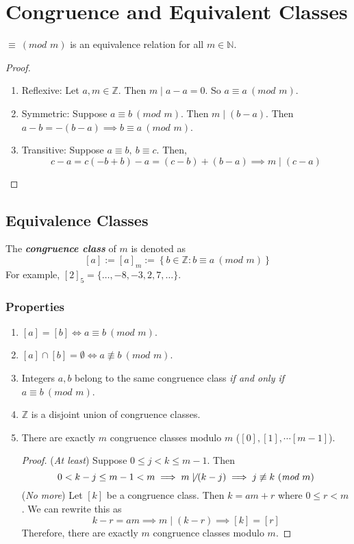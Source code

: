 \documentclass{report}
\newcommand{\Z}{\mathbb{Z}}
\newcommand{\N}{\mathbb{N}}
\newcommand{\textib}[1]{\textit{\textbf{{#1}}}}
\newcommand{\proposition}[1]{\begin{tcolorbox}[title=\textit{Proposition}]{#1}\end{tcolorbox}}
\renewcommand{\mod}[1]{\ (\textit{mod } {#1})}
\begin{document}
\section{Congruence and Equivalent Classes}
\proposition {
    $\equiv \mod{m}$ is an equivalence relation for all $m \in \N$.
}
\begin{proof}
    \begin{enumerate}[label=\textit{(\roman*)}]
        \item Reflexive: Let $a, m \in \Z$. Then $m \mid a - a = 0$. So $a \equiv a \mod{m}$.
        \item Symmetric: Suppose $a \equiv b \mod{m}$. Then $m \mid (b - a)$. Then $a - b = - (b - a)
            \implies b \equiv a \mod{m}$.
        \item Transitive: Suppose $a \equiv b, \ b \equiv c$. Then, 
            \[c - a = c (- b + b) - a = (c - b) + (b - a) \implies m \mid (c - a)\]
    \end{enumerate}
\end{proof}

\subsection{Equivalence Classes}
The \textib{congruence class} of $m$ is denoted as
\[[a] := [a]_m := \left\{ b \in \Z : b \equiv a \mod{m} \right\}\]
For example, $[2]_5 = \{ \ldots, -8, -3, 2, 7, \ldots \}$.


\subsubsection{Properties}
\begin{enumerate}[label=\textit{(\roman*)}]
    \item $[a] = [b] \iff a \equiv b \mod{m}$.
    \item $[a] \cap [b] = \emptyset \iff a \not \equiv b \mod{m}$.
    \item Integers $a, b$ belong to the same congruence class \textit{if and only if} $a \equiv b \mod{m}$.
    \item $\Z$ is a disjoint union of congruence classes.
    \item There are exactly $m$ congruence classes modulo $m$ ($[0], [1], \cdots [m - 1]$).
        \begin{proof}
            (\textit{At least})
            \newline
            Suppose $0 \leq j < k \leq m - 1$. Then 
            \[0 < k - j \leq m - 1 < m \implies m \not \mid (k - j) \implies j \not \equiv k \mod{m}\]
            (\textit{No more})
            \newline
            Let $[k]$ be a congruence class. Then $k = am + r$ where $0 \leq r < m$. We can rewrite
            this as 
            \[k - r = am \implies m \mid (k - r) \implies [k] = [r]\] Therefore, there are
            exactly $m$ congruence classes modulo $m$.
        \end{proof}
\end{enumerate}
\end{document}
